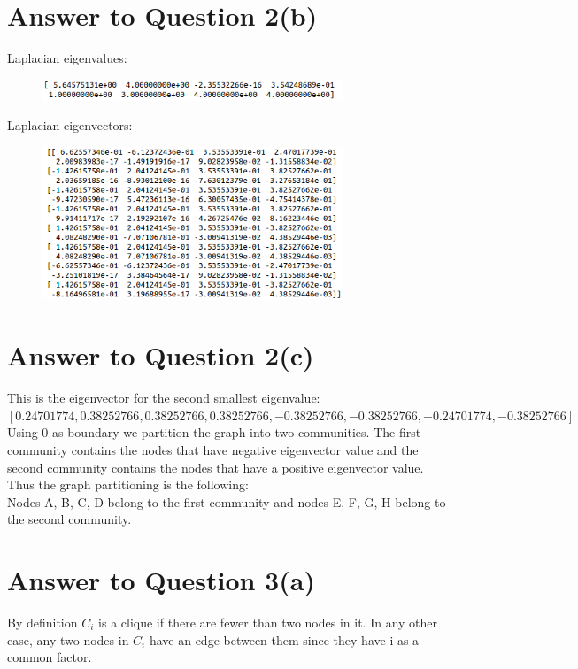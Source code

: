 \documentclass[11pt]{article}
\begin{document}
\section*{Answer to Question 2(b)}
Laplacian eigenvalues:
\begin{figure}[h]
\centering
\includegraphics[width=0.8\textwidth]{./figures/L_eigval}
\end{figure}

Laplacian eigenvectors:
\begin{figure}[h]
\centering
\includegraphics[width=0.8\textwidth]{./figures/L_eigvec}
\end{figure}

\section*{Answer to Question 2(c)}
This is the eigenvector for the second smallest eigenvalue:\\
$[0.24701774,  0.38252766,  0.38252766,  0.38252766, -0.38252766, -0.38252766, -0.24701774, -0.38252766]$ \\
Using 0 as boundary we partition the graph into two communities. The first community contains the nodes that have negative eigenvector value and the second community contains the nodes that have a positive eigenvector value. \\
Thus the graph partitioning is the following: \\
Nodes A, B, C, D belong to the first community and nodes E, F, G, H belong to the second community.
\section*{Answer to Question 3(a)}
By definition $C_i$ is a clique if there are fewer than two nodes in it. 
In any other case, any two nodes in $C_i$ have an edge between them since they have i as a common factor.
\end{document}
